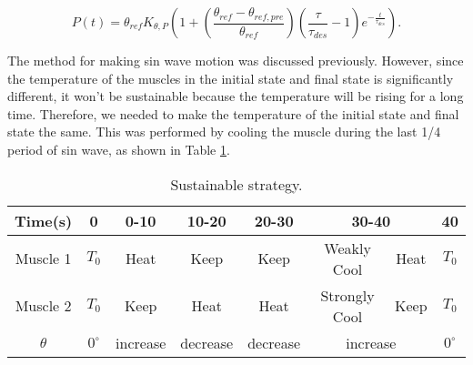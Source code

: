 \begin{equation} \label{power_derived}
P(t)=\theta_{ref}K_{\theta,P}\left(1+\left(\frac{\theta_{ref}-\theta_{ref,pre}}{\theta_{ref}}\right)\left(\frac{\tau}{\tau_{des}}-1\right)e^{-\frac{t}{\tau_{des}}}\right).
\end{equation}





The method for making sin wave motion was discussed previously. However, since the temperature of the muscles in the initial state and final state is significantly different, it won't be sustainable because the temperature will be rising for a long time. Therefore, we needed to make the temperature of the initial state and final state the same. This was performed by cooling the muscle during the last 1/4 period of sin wave, as shown in Table \ref{table_apc_sustain}.

\begin{table}[t]
	\caption{Sustainable \apc strategy.}
	\label{table_apc_sustain}
	\begin{center}
		\begin{tabular}{c||c|c|c|c|c|c|c}
			\hline
			Time(s) & 0 & 0-10 & 10-20 & 20-30 & \multicolumn{2}{|c|}{30-40} & 40 \\
			\hline
			Muscle 1 & $T_0$ & Heat & Keep & Keep & Weakly Cool & Heat & $T_0$ \\
			Muscle 2 & $T_0$ & Keep & Heat & Heat & Strongly Cool & Keep & $T_0$ \\
			\hline
			$\theta$ & $0^{\circ}$ & increase & decrease & decrease & \multicolumn{2}{|c|}{increase} & $0^{\circ}$ \\
			\hline
		\end{tabular}
	\end{center}
\end{table}